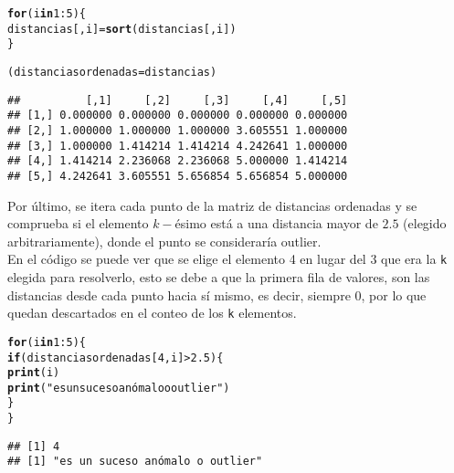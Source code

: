 \documentclass[12pt]{report}\usepackage[]{graphicx}\usepackage[dvipsnames]{xcolor}
\makeatletter
\newcommand{\hlnum}[1]{\textcolor[rgb]{0.686,0.059,0.569}{#1}}%
\newcommand{\hlstr}[1]{\textcolor[rgb]{0.192,0.494,0.8}{#1}}%
\newcommand{\hlopt}[1]{\textcolor[rgb]{0,0,0}{#1}}%
\newcommand{\hlstd}[1]{\textcolor[rgb]{0.345,0.345,0.345}{#1}}%
\newcommand{\hlkwa}[1]{\textcolor[rgb]{0.161,0.373,0.58}{\textbf{#1}}}%
\newcommand{\hlkwb}[1]{\textcolor[rgb]{0.69,0.353,0.396}{#1}}%
\newcommand{\hlkwd}[1]{\textcolor[rgb]{0.737,0.353,0.396}{\textbf{#1}}}%
\newenvironment{kframe}{%
 \def\at@end@of@kframe{}%
 \ifinner\ifhmode%
  \def\at@end@of@kframe{\end{minipage}}%
  \begin{minipage}{\columnwidth}%
 \fi\fi%
 \def\FrameCommand##1{\hskip\@totalleftmargin \hskip-\fboxsep
 \colorbox{shadecolor}{##1}\hskip-\fboxsep
     \hskip-\linewidth \hskip-\@totalleftmargin \hskip\columnwidth}%
 \MakeFramed {\advance\hsize-\width
   \@totalleftmargin\z@ \linewidth\hsize
   \@setminipage}}%
 {\par\unskip\endMakeFramed%
 \at@end@of@kframe}
\newenvironment{knitrout}{}{} %
\makeatother
\begin{document}
\begin{knitrout}
\color{fgcolor}\begin{kframe}
\begin{alltt}
\hlkwa{for} \hlstd{(i} \hlkwa{in} \hlnum{1}\hlopt{:}\hlnum{5}\hlstd{) \{}
        \hlstd{distancias[,i]} \hlkwb{=} \hlkwd{sort}\hlstd{(distancias[,i])}
\hlstd{\}}

\hlstd{(distanciasordenadas}\hlkwb{=}\hlstd{distancias)}
\end{alltt}
\begin{verbatim}
##          [,1]     [,2]     [,3]     [,4]     [,5]
## [1,] 0.000000 0.000000 0.000000 0.000000 0.000000
## [2,] 1.000000 1.000000 1.000000 3.605551 1.000000
## [3,] 1.000000 1.414214 1.414214 4.242641 1.000000
## [4,] 1.414214 2.236068 2.236068 5.000000 1.414214
## [5,] 4.242641 3.605551 5.656854 5.656854 5.000000
\end{verbatim}
\end{kframe}
\end{knitrout}
					
					Por último, se itera cada punto de la matriz de distancias ordenadas y se comprueba si el elemento $k-$ésimo está a una distancia mayor de $2.5$ (elegido arbitrariamente), donde el punto se consideraría outlier.\\
					
					En el código se puede ver que se elige el elemento 4 en lugar del 3 que era la \texttt{k} elegida para resolverlo, esto se debe a que la primera fila de valores, son las distancias desde cada punto hacia sí mismo, es decir, siempre 0, por lo que quedan descartados en el conteo de los \texttt{k} elementos.
					
\begin{knitrout}
\color{fgcolor}\begin{kframe}
\begin{alltt}
\hlkwa{for} \hlstd{(i} \hlkwa{in} \hlnum{1}\hlopt{:}\hlnum{5}\hlstd{) \{}
        \hlkwa{if} \hlstd{(distanciasordenadas[}\hlnum{4}\hlstd{,i]} \hlopt{>} \hlnum{2.5}\hlstd{) \{}
                \hlkwd{print}\hlstd{(i)}
                \hlkwd{print}\hlstd{(}\hlstr{"es un suceso anómalo o outlier"}\hlstd{)}
        \hlstd{\}}
\hlstd{\}}
\end{alltt}
\begin{verbatim}
## [1] 4
## [1] "es un suceso anómalo o outlier"
\end{verbatim}
\end{kframe}
\end{knitrout}
					
\end{document}
